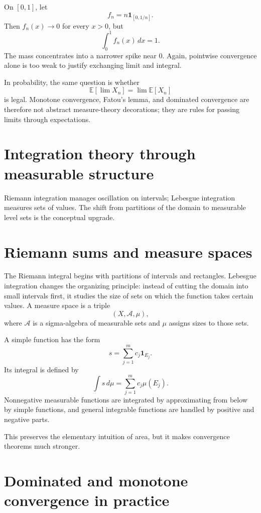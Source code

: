 \begin{example}
On \([0,1]\), let
\[
  f_n=n\mathbf 1_{[0,1/n]}.
\]
Then \(f_n(x)\to0\) for every \(x>0\), but
\[
  \int_0^1 f_n(x)\,dx=1.
\]
The mass concentrates into a narrower spike near \(0\).  Again, pointwise convergence alone is too weak to justify exchanging limit and integral.
\end{example}

\begin{remark}
In probability, the same question is whether
\[
  \mathbb E[\lim X_n]=\lim\mathbb E[X_n]
\]
is legal.  Monotone convergence, Fatou's lemma, and dominated convergence are therefore not abstract measure-theory decorations; they are rules for passing limits through expectations.
\end{remark}
\section{Integration theory through measurable structure}
Riemann integration manages oscillation on intervals; Lebesgue integration measures sets of values.  The shift from partitions of the domain to measurable level sets is the conceptual upgrade.

\section{Riemann sums and measure spaces}

The Riemann integral begins with partitions of intervals and rectangles.  Lebesgue integration changes the organizing principle: instead of cutting the domain into small intervals first, it studies the size of sets on which the function takes certain values.  A measure space is a triple
\[
  (X,\mathcal A,\mu),
\]
where $\mathcal A$ is a sigma-algebra of measurable sets and $\mu$ assigns sizes to those sets.

A simple function has the form
\[
  s=\sum_{j=1}^m c_j\mathbf 1_{E_j}.
\]
Its integral is defined by
\[
  \int s\,d\mu=\sum_{j=1}^m c_j\mu(E_j).
\]
Nonnegative measurable functions are integrated by approximating from below by simple functions, and general integrable functions are handled by positive and negative parts.

This preserves the elementary intuition of area, but it makes convergence theorems much stronger.

\section{Dominated and monotone convergence in practice}

